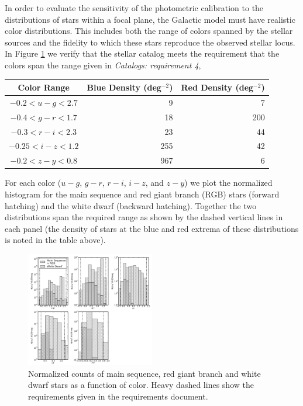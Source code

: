 \documentclass[11pt]{article}
\begin{document}
In order to evaluate the sensitivity of the photometric calibration to
the distributions of stars within a focal plane, the Galactic model
must have realistic color distributions.  This includes both the range
of colors spanned by the stellar sources and the fidelity to which
these stars reproduce the observed stellar locus. In Figure
\ref{fig:starcolorspan} we verify that the stellar catalog meets the
requirement that the colors span the range given in {\it Catalogs:
  requirement 4},
\begin{center}
\begin{tabular}{c|r|r}
  Color Range& Blue Density (deg$^{-2}$) & Red Density (deg$^{-2}$)\\
\hline
  $ -0.2 < u-g <        2.7 $&9&7\\
  $  -0.4  <  g-r <       1.7 $&18&200\\
  $ -0.3   <  r-i <    2.3 $&23&44\\
  $  -0.25 < i-z <       1.2 $&255&42\\ 
  $  -0.2 <  z-y   <    0.8 $&967&6
\end{tabular}
\end{center}
For each color ($u-g$, $g-r$, $r-i$, $i-z$, and $z-y$) we plot the
normalized histogram for the main sequence and red giant branch (RGB)
stars (forward hatching) and the white dwarf (backward hatching).
Together the two distributions span the required range as shown by the
dashed vertical lines in each panel (the density of stars at the blue
and red extrema of these distributions is noted in the table above). 
\begin{figure}[h]
\centering
\includegraphics[width=0.5\textwidth]{validation_figures/star_lsst_color_hist.png}
\caption{Normalized counts of main sequence, red giant branch and white dwarf stars as a function of color.  Heavy dashed lines show the requirements given in the requirements document.\label{fig:starcolorspan}}
\end{figure}
\end{document}
